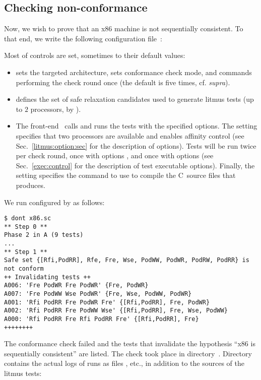 \subsection{Checking  non-conformance}
Now, we wish to prove that an x86 machine is not
sequentially consistent.
To that end, we write the following configuration file~:

Most of \dont{} controls are set, sometimes to
their default values:
\begin{itemize}
\item {} sets the targeted architecture,
 sets conformance check mode,
and  commands performing the check round once
(the default is five times, cf. \emph{supra}).
\item {} defines
the set of safe relaxation candidates used to generate litmus tests
(up to $2$ processors, by ).
\item The front-end~\dont{} calls \litmus{} and runs the tests
with the specified options.
The setting  specifies that two processors
are available and enables affinity control (see Sec.~\ref{litmus:option:sec}
for the description of \litmus{} options).
Tests will be run twice per check round, once
with options ,
and once with options 
(see Sec.~\ref{exec:control} for the description of test executable options).
Finally, the setting  specifies the command to use
to compile the C~source files that \litmus{} produces.
\end{itemize}
We run \dont{} configured by  as follows:
\begin{verbatim}
$ dont x86.sc 
** Step 0 **
Phase 2 in A (9 tests)
...
** Step 1 **
Safe set {[Rfi,PodRR], Rfe, Fre, Wse, PodWW, PodWR, PodRW, PodRR} is not conform
++ Invalidating tests ++
A006: 'Fre PodWR Fre PodWR' {Fre, PodWR}
A007: 'Fre PodWW Wse PodWR' {Fre, Wse, PodWW, PodWR}
A001: 'Rfi PodRR Fre PodWR Fre' {[Rfi,PodRR], Fre, PodWR}
A002: 'Rfi PodRR Fre PodWW Wse' {[Rfi,PodRR], Fre, Wse, PodWW}
A000: 'Rfi PodRR Fre Rfi PodRR Fre' {[Rfi,PodRR], Fre}
++++++++
\end{verbatim}
The conformance check failed and the tests that invalidate the hypothesis
``x86 is sequentially consistent'' are listed.
The check took place in directory~.
Directory~ contains the actual logs of \litmus{} runs
as files ,  etc.,
in addition to the sources of the litmus tests:
